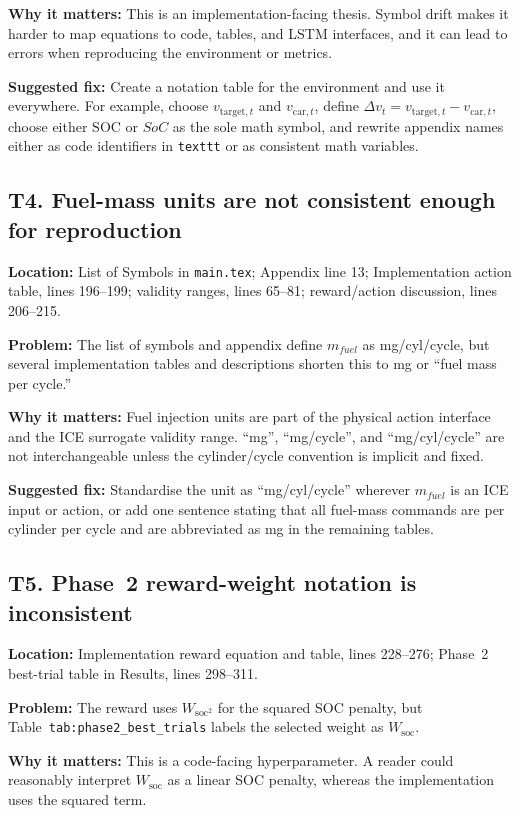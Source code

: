 \documentclass[11pt,a4paper]{article}
\newcommand{\loc}[1]{\textbf{Location:} #1\par}
\newcommand{\problem}{\textbf{Problem:} }
\newcommand{\why}{\textbf{Why it matters:} }
\newcommand{\fix}{\textbf{Suggested fix:} }
\begin{document}
\why This is an implementation-facing thesis. Symbol drift makes it harder to map equations to code, tables, and LSTM interfaces, and it can lead to errors when reproducing the environment or metrics.

\fix Create a notation table for the environment and use it everywhere. For example, choose $v_{\mathrm{target},t}$ and $v_{\mathrm{car},t}$, define $\Delta v_t=v_{\mathrm{target},t}-v_{\mathrm{car},t}$, choose either $\mathrm{SOC}$ or $SoC$ as the sole math symbol, and rewrite appendix names either as code identifiers in \texttt{texttt} or as consistent math variables.

\subsection*{T4. Fuel-mass units are not consistent enough for reproduction}

\loc{List of Symbols in \texttt{main.tex}; Appendix line 13; Implementation action table, lines 196--199; validity ranges, lines 65--81; reward/action discussion, lines 206--215.}
\problem The list of symbols and appendix define $m_{fuel}$ as mg/cyl/cycle, but several implementation tables and descriptions shorten this to mg or ``fuel mass per cycle.''

\why Fuel injection units are part of the physical action interface and the ICE surrogate validity range. ``mg'', ``mg/cycle'', and ``mg/cyl/cycle'' are not interchangeable unless the cylinder/cycle convention is implicit and fixed.

\fix Standardise the unit as ``mg/cyl/cycle'' wherever $m_{fuel}$ is an ICE input or action, or add one sentence stating that all fuel-mass commands are per cylinder per cycle and are abbreviated as mg in the remaining tables.

\subsection*{T5. Phase~2 reward-weight notation is inconsistent}

\loc{Implementation reward equation and table, lines 228--276; Phase~2 best-trial table in Results, lines 298--311.}
\problem The reward uses $W_{\text{soc}^2}$ for the squared SOC penalty, but Table~\texttt{tab:phase2\_best\_trials} labels the selected weight as $W_{\text{soc}}$.

\why This is a code-facing hyperparameter. A reader could reasonably interpret $W_{\text{soc}}$ as a linear SOC penalty, whereas the implementation uses the squared term.
\end{document}
